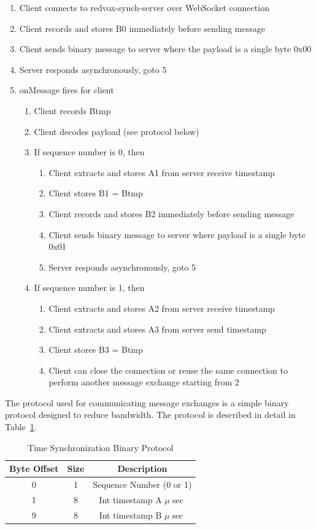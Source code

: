\begin{enumerate}
	\item Client connects to redvox-synch-server over WebSocket connection
	\item Client records and stores B0 immediately before sending message
	\item Client sends binary message to server where the payload is a single byte 0x00
	\item Server responds asynchronously, goto 5
	\item onMessage fires for client
	\begin{enumerate}
		\item Client records Btmp
		\item Client decodes payload (see protocol below)
		\item If sequence number is 0, then
		\begin{enumerate}
			\item Client extracts and stores A1 from server receive timestamp
			\item Client stores B1 = Btmp
			\item Client records and stores B2 immediately before sending message
			\item Client sends binary message to server where payload is a single byte 0x01
			\item Server responds asynchronously, goto 5
		\end{enumerate}
		\item If sequence number is 1, then
		\begin{enumerate}
			\item Client extracts and stores A2 from server receive timestamp
			\item Client extracts and stores A3 from server send timestamp
			\item Client stores B3 = Btmp
			\item Client can close the connection or reuse the same connection to perform another message exchange starting from 2
		\end{enumerate}
	\end{enumerate}
\end{enumerate}

The protocol used for communicating message exchanges is a simple binary protocol designed to reduce bandwidth. The protocol is described in detail in Table~\ref{table:syncproto}.

\begin{table}[H]
	\centering
	\caption{Time Synchronization Binary Protocol}
	\begin{tabular}{|c|c|c|}
		\hline
		Byte Offset & Size & Description \\
		\hline
		0 & 1 & Sequence Number (0 or 1) \\
		\hline
		1 &  8 & Int timestamp A $\mu\sec$  \\
		\hline
		9 & 8 & Int timestamp B $\mu\sec$ \\
		\hline
	\end{tabular}
	\label{table:syncproto}
\end{table}

